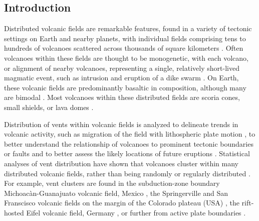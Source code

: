 \documentclass[draft,jgrga]{agutex}
\begin{document}
%
%

%

\begin{article}

%
%



\section{Introduction} 
Distributed volcanic fields are remarkable features, found in a variety of tectonic settings on Earth and nearby planets, with individual fields comprising tens to hundreds of volcanoes scattered across thousands of square kilometers \citep{Williams1950, Hasenaka1985, Addington2001, Richardson2013}. Often volcanoes within these fields are thought to be monogenetic, with each volcano, or alignment of nearby volcanoes, representing a single, relatively short-lived magmatic event, such as intrusion and eruption of a dike swarm \citep{Rittmann1962, Nakamura1977}. On Earth, these volcanic fields are predominantly basaltic in composition, although many are bimodal \citep{Bacon1982, Mazzarini2004}. Most volcanoes within these distributed fields are scoria cones, small shields, or lava domes \citep{Valentine2015, Kereszturi2016}. 

Distribution of vents within volcanic fields is analyzed to delineate trends in volcanic activity, such as migration of the field with lithospheric plate motion \citep{Tanaka1986,  Condit1989}, to better understand the relationship of volcanoes to prominent tectonic boundaries or faults \citep{Conway1997,Heming1980,vandenHove2017} and to better assess the likely locations of future eruptions \citep{Connor2012, Cappello2012}. Statistical analyses of vent distribution have shown that volcanoes cluster within many distributed volcanic fields, rather than being randomly or regularly distributed \citep{LeCorvec2013}. For example, vent clusters are found in the subduction-zone boundary Michoac\`an-Guanajuato volcanic field, Mexico \citep{Connor1990}, the Springerville and San Franscisco volcanic fields on the margin of the Colorado plateau (USA) \citep{Condit1996, Conway1998}, the rift-hosted Eifel volcanic field, Germany \citep{Schmincke1983,Jaquet2006}, or further from active plate boundaries \citep{Wei2003, Cas2016, vandenHove2017}.


\end{article}
\end{document}
